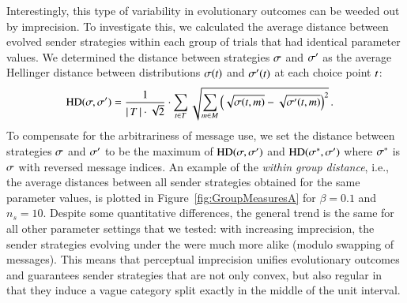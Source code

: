 \documentclass[fleqn,reqno,10pt]{article}
\newcommand{\rdd}{\acro{rdd}} %
\begin{document}
Interestingly, this type of variability in evolutionary outcomes can
be weeded out by imprecision. To investigate this, we calculated the average
distance between evolved sender strategies within each group of trials
that had identical parameter values. We determined the distance
between strategies $\sigma$ and $\sigma'$ as the average Hellinger
distance between distributions $\sigma(t)$ and
$\sigma'(t)$ at each choice point $t$:
\begin{align*}
  \text{HD}(\sigma,\sigma') & = \frac{1}{{\left \lvert \, T \, \right\rvert \cdot
     \sqrt{2}}} \cdot  \sum_{t \in T} 
 \sqrt{\sum_{m \in  M}
         \left ( \sqrt{\sigma(t,m)} -
         \sqrt{\sigma'(t,m)} \right )^2 }\,.
\end{align*}
To compensate for the arbitrariness of message use, we set the distance between strategies
$\sigma$ and $\sigma'$ to be the maximum of $\text{HD}(\sigma,\sigma')$ and
$\text{HD}(\sigma^*,\sigma')$ where $\sigma^*$ is $\sigma$ with reversed message
indices. An example of the \emph{within group distance}, i.e., the average distances between
all sender strategies obtained for the same parameter values, is plotted in
Figure~\ref{fig:GroupMeasuresA} for $\beta = 0.1$ and $n_s = 10$. Despite some quantitative
differences, the general trend is the same for all other parameter settings that we tested:
with increasing imprecision, the sender strategies evolving under the \rdd were much more alike
(modulo swapping of messages). This means that perceptual imprecision unifies evolutionary
outcomes and guarantees sender strategies that are not only convex, but also regular in that
they induce a vague category split exactly in the middle of the unit interval.
\end{document}
